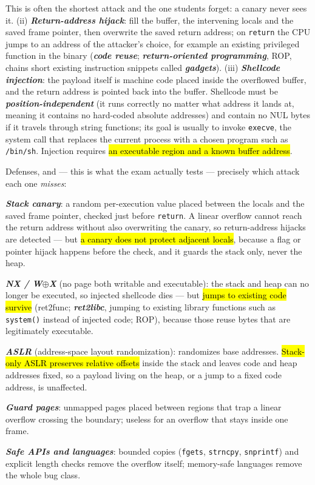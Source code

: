 \documentclass[12pt, a4paper]{article}
\newcommand{\term}[1]{\textbf{\textit{#1}}}        %
\newcommand{\imp}[1]{\hl{#1}}                       %
\begin{document}
This is often the shortest attack and the one students forget: a canary never sees it. (ii) \term{Return-address hijack}: fill the buffer, the intervening locals and the saved frame pointer, then overwrite the saved return address; on \texttt{return} the CPU jumps to an address of the attacker's choice, for example an existing privileged function in the binary (\term{code reuse}; \term{return-oriented programming}, ROP, chains short existing instruction snippets called \term{gadgets}). (iii) \term{Shellcode injection}: the payload itself is machine code placed inside the overflowed buffer, and the return address is pointed back into the buffer.
Shellcode must be \term{position-independent} (it runs correctly no matter what address it lands at, meaning it contains no hard-coded absolute addresses) and contain no NUL bytes if it travels through string functions; its goal is usually to invoke \texttt{execve}, the system call that replaces the current process with a chosen program such as \texttt{/bin/sh}. Injection requires \imp{an executable region and a known buffer address}.

Defenses, and --- this is what the exam actually tests --- precisely which attack each one \emph{misses}:
\begin{tightitem}
    \item \term{Stack canary}: a random per-execution value placed between the locals and the saved frame pointer, checked just before \texttt{return}.
    A linear overflow cannot reach the return address without also overwriting the canary, so return-address hijacks are detected --- but \imp{a canary does not protect adjacent locals}, because a flag or pointer hijack happens before the check, and it guards the stack only, never the heap.
    \item \term{NX / W$\oplus$X} (no page both writable and executable): the stack and heap can no longer be executed, so injected shellcode dies --- but \imp{jumps to existing code survive} (ret2func; \term{ret2libc}, jumping to existing library functions such as \texttt{system()} instead of injected code; ROP), because those reuse bytes that are legitimately executable.
    \item \term{ASLR} (address-space layout randomization): randomizes base addresses. \imp{Stack-only ASLR preserves relative offsets} inside the stack and leaves code and heap addresses fixed, so a payload living on the heap, or a jump to a fixed code address, is unaffected.
    \item \term{Guard pages}: unmapped pages placed between regions that trap a linear overflow crossing the boundary; useless for an overflow that stays inside one frame.
    \item \term{Safe APIs and languages}: bounded copies (\texttt{fgets}, \texttt{strncpy}, \texttt{snprintf}) and explicit length checks remove the overflow itself; memory-safe languages remove the whole bug class.
\end{tightitem}
\end{document}
